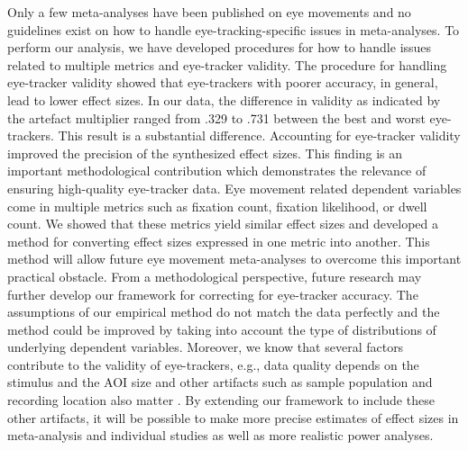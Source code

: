 \documentclass[english,natbib,man,floatsintext]{apa6}
\begin{document}
Only a few meta-analyses have been published on eye movements and no guidelines exist on how to handle eye-tracking-specific issues in meta-analyses. To perform our analysis, we have developed procedures for how to handle issues related to multiple metrics and eye-tracker validity. The procedure for handling eye-tracker validity showed that eye-trackers with poorer accuracy, in general, lead to lower effect sizes. In our data, the difference in validity as indicated by the artefact multiplier ranged from .329 to .731 between the best and worst eye-trackers. This result is a substantial difference. Accounting for eye-tracker validity improved the precision of the synthesized effect sizes. This finding is an important methodological contribution which demonstrates the relevance of ensuring high-quality eye-tracker data. Eye movement related dependent variables come in multiple metrics such as fixation count, fixation likelihood, or dwell count. We showed that these metrics yield similar effect sizes and developed a method for converting effect sizes expressed in one metric into another. This method will allow future eye movement meta-analyses to overcome this important practical obstacle. From a methodological perspective, future research may further develop our framework for correcting for eye-tracker accuracy. The assumptions of our empirical method do not match the data perfectly and the method could be improved by taking into account the type of distributions of underlying dependent variables. Moreover, we know that several factors contribute to the validity of eye-trackers, e.g., data quality depends on the stimulus and the AOI size \citep{orquin2018a} and other artifacts such as sample population and recording location also matter \citep{nystroem2013a}. By extending our framework to include these other artifacts, it will be possible to make more precise estimates of effect sizes in meta-analysis and individual studies as well as more realistic power analyses.\\   
\end{document}
